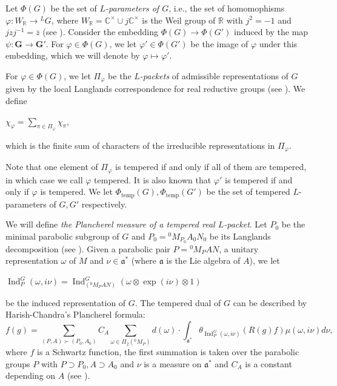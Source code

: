 \documentclass[11pt]{article}
\theoremstyle{plain}
\theoremstyle{remark}
\theoremstyle{definition}
\DeclareMathOperator{\Ind}{Ind}
\DeclareMathOperator{\tp}{temp}
\begin{document}
Let $\Phi(G)$ be the set of {\it $L$-parameters of $G$}, i.e., the set of homomophisms $\varphi\colon W_{\mathbb{R}}\to {}^{L}G$, where $W_{\mathbb{R}}=\mathbb{C}^{\times}\cup j\mathbb{C}^{\times}$ is the Weil group of $\mathbb{R}$ with $j^{2}=-1$ and $jzj^{-1}=\overline{z}$ (see \cite[\S 8]{BoAutoL}). 
Consider the embedding $\Phi(G)\to \Phi(G')$ induced by the map $\psi\colon \mathbf{G} \to \mathbf{G}'$. 
For $\varphi\in \Phi(G)$, we let $\varphi'\in \Phi(G')$ be the image of $\varphi$ under this embedding, which we will denote by $\varphi\mapsto \varphi'$. 


For $\varphi\in \Phi(G)$, we let $\Pi_{\varphi}$ be the {\it $L$-packets} of admissible representations of $G$ given by the local Langlands correspondence for real reductive groups (see \cite{Llds89}). 
We define
\begin{center}
    $\chi_{\varphi}=\sum_{\pi\in \Pi_{\varphi}}\chi_{\pi}$,
\end{center}
which is the finite sum of characters of the irreducible representations in $\Pi_{\varphi}$. 


Note that one element of $\Pi_{\varphi}$ is tempered if and only if all of them are tempered, in which case we call $\varphi$ tempered. 
It is also known that $\varphi'$ is tempered if and only if $\varphi$ is tempered. 
We let $\Phi_{\tp}(G),\Phi_{\tp}(G')$ be the set of tempered $L$-parameters of $G,G'$ respectively.  

We will define {\it the Plancherel measure of a tempered real $L$-packet}. 
Let $P_0$ be the minimal parabolic subgroup of $G$ and $P_0={}^{0}M_{P_0}A_{0}N_{0}$ be its Langlands decomposition (see \cite[\S 2.2.7]{Wallach1}). 
Given a parabolic pair $P={}^{0}{M}_P AN$, a unitary representation $\omega$ of $M$ and $\nu\in \mathfrak{a}^{*}$ (where $\mathfrak{a}$ is the Lie algebra of $A$), we let 
\begin{center}
    $\Ind_{P}^{G}(\omega,i\nu)=\Ind_{(^{0}{M}_P AN)}^{G}(\omega\otimes\exp(i\nu)\otimes 1)$
\end{center} 
be the induced representation of $G$.  
The tempered dual of $G$ can be described by Harish-Chandra's Plancherel formula:
\begin{equation}\label{eRPformula}
    f(g)=\sum\limits_{(P,A)\succ (P_0,A_0)}C_A\sum\limits_{\omega\in \Pi_2(^{0}{M}_P)}d(\omega)\cdot \int_{\mathfrak{a}^{*}}\theta_{\Ind_{P}^{G}(\omega,i\nu)}(R(g)f)\mu(\omega,i\nu)d\nu,
\end{equation}
where $f$ is a Schwartz function, the first summation is taken over the parabolic groups $P$ with $P\supset P_0, A\supset A_0$ and $\nu$ is a measure on $\mathfrak{a}^{*}$ and $C_A$ is a constant depending on $A$ (see \cite[\S 13.4]{Wallach2}).  
\end{document}
